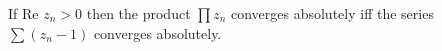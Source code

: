 If $\text{Re } z_n > 0$ then the product $\prod z_n$ converges absolutely iff the series $\sum (z_n - 1)$ converges absolutely.
